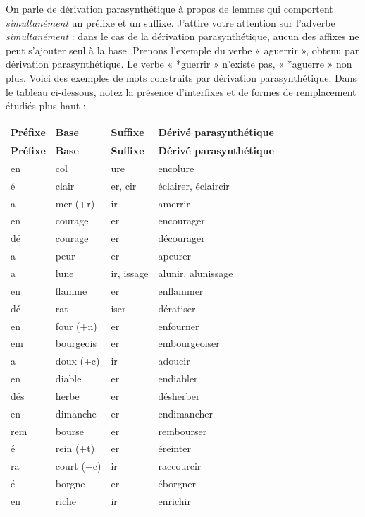 On parle de dérivation parasynthétique à propos de lemmes qui comportent \textit{simultanément} un préfixe et un suffixe. J’attire votre attention sur l’adverbe \textit{simultanément} : dans le cas de la dérivation parasynthétique, aucun des affixes ne peut s’ajouter seul à la base. Prenons l’exemple du verbe « aguerrir », obtenu par dérivation parasynthétique. Le verbe « *guerrir » n’existe pas, « *aguerre » non plus. Voici des exemples de mots construits par dérivation parasynthétique. Dans le tableau ci-dessous, notez la présence d’interfixes et de formes de remplacement étudiés plus haut :
\begingroup\small
\begin{longtable}{p{.12\linewidth}p{.22\linewidth}p{.16\linewidth}p{.34\linewidth}}
\toprule\textbf{Préfixe}&\textbf{Base}&\textbf{Suffixe}&\textbf{Dérivé parasynthétique}\\\midrule\endfirsthead
\toprule\textbf{Préfixe}&\textbf{Base}&\textbf{Suffixe}&\textbf{Dérivé parasynthétique}\\\midrule\endhead
en&col&ure&encolure\\
é&clair&er, cir&éclairer, éclaircir\\
a&mer (+r)&ir&amerrir\\
en&courage&er&encourager\\
dé&courage&er&décourager\\
a&peur&er&apeurer\\
a&lune&ir, issage&alunir, alunissage\\
en&flamme&er&enflammer\\
dé&rat&iser&dératiser\\
en&four (+n)&er&enfourner\\
em&bourgeois&er&embourgeoiser\\
a&doux (+c)&ir&adoucir\\
en&diable&er&endiabler\\
dés&herbe&er&désherber\\
en&dimanche&er&endimancher\\
rem&bourse&er&rembourser\\
é&rein (+t)&er&éreinter\\
ra&court (+c)&ir&raccourcir\\
é&borgne&er&éborgner\\
en&riche&ir&enrichir\\\bottomrule
\end{longtable}
\endgroup
{}

